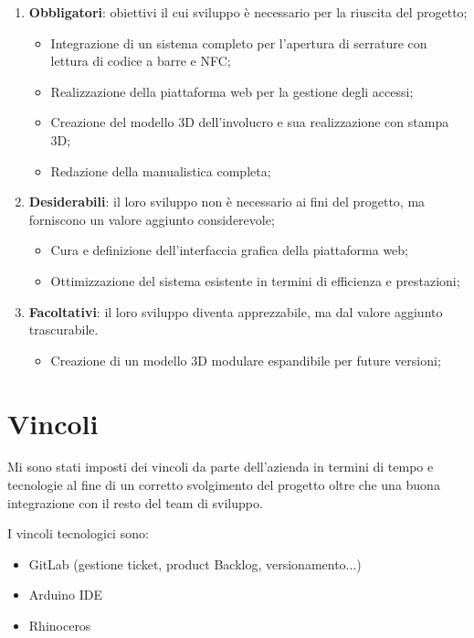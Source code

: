 \begin{enumerate}
\item \textbf{Obbligatori}: obiettivi il cui sviluppo è necessario per la riuscita del progetto;
\begin{itemize}
\item Integrazione di un sistema completo per l'apertura di serrature con lettura di codice a barre e NFC; 
\item Realizzazione della piattaforma web per la gestione degli accessi; 
\item Creazione del modello 3D dell'involucro e sua realizzazione con stampa 3D; 
\item Redazione della manualistica completa; 
\end{itemize}
\item \textbf{Desiderabili}: il loro sviluppo non è necessario ai fini del progetto, ma forniscono un valore aggiunto considerevole;
\begin{itemize}
\item Cura e definizione dell'interfaccia grafica della piattaforma web;
\item Ottimizzazione del sistema esistente in termini di efficienza e prestazioni; 
\end{itemize}
\item \textbf{Facoltativi}: il loro sviluppo diventa apprezzabile, ma dal valore aggiunto trascurabile.
\begin{itemize}
\item Creazione di un modello 3D modulare espandibile per future versioni; 
\end{itemize}
\end{enumerate}

\section{Vincoli}
Mi sono stati imposti dei vincoli da parte dell'azienda in termini di tempo e tecnologie al fine di un corretto svolgimento del progetto oltre che una buona integrazione con il resto del team di sviluppo.

I vincoli tecnologici sono:
\begin{itemize}
\item GitLab (gestione ticket, product Backlog, versionamento...)
\item Arduino IDE
\item Rhinoceros
\end{itemize}

